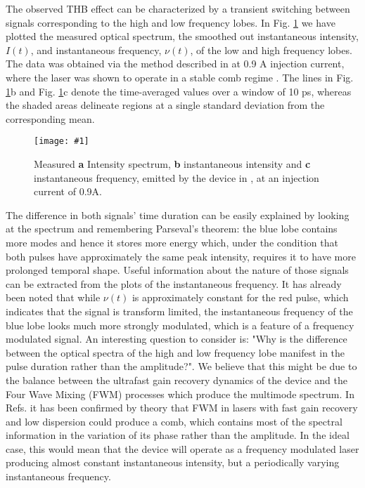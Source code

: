 \documentclass[]{spie}  %
\newcommand{\includegraphicsXL}[1]{\texttt{[image: \#1]}}
\begin{document}
The observed THB effect can be characterized by a transient switching between signals corresponding to the high and low frequency lobes. In Fig. \ref{fig:exper_0p9A} we have plotted  the measured optical spectrum, the smoothed out instantaneous intensity, $I(t)$, and instantaneous frequency, $\nu(t)$, of the low and high frequency lobes. The data was obtained via the method described in  at 0.9 A injection current, where the laser was shown to operate in a stable comb regime \cite{burghoff2014terahertz}. The lines in Fig. \ref{fig:exper_0p9A}b and Fig. \ref{fig:exper_0p9A}c denote the time-averaged values over a window of 10 ps, whereas the shaded areas delineate regions at a single standard deviation from the corresponding mean.  

\begin{figure}[h!]
	\begin{center}
		\includegraphicsXL{IMGS/exper_0p9A.eps}
		\caption{ Measured \textbf{a} Intensity spectrum, \textbf{b} instantaneous intensity and \textbf{c} instantaneous frequency, emitted by the device in , at an injection current of 0.9A.} \label{fig:exper_0p9A}
	\end{center}	
\end{figure}

The difference in both signals' time duration can be easily explained by looking at the spectrum and remembering Parseval's theorem: the blue lobe contains more modes and hence it stores more energy which, under the condition that both pulses have approximately the same peak intensity, requires it to have more prolonged temporal shape. Useful information about the nature of those signals can be extracted from the plots of the instantaneous frequency. It has already been noted \cite{burghoff2015evaluating} that while $\nu(t)$  is approximately constant for the red pulse, which indicates that the signal is transform limited, the instantaneous frequency of the blue lobe looks much more strongly modulated, which is a feature of a frequency modulated signal. An interesting question to consider is: "Why is the difference between the optical spectra of the high and low frequency lobe manifest in the pulse duration rather than the amplitude?". We believe that this might be due to the balance between the ultrafast gain recovery dynamics of the device and the Four Wave Mixing (FWM) processes which produce the multimode spectrum. In Refs.  it has been confirmed by theory that FWM in lasers with fast gain recovery and low dispersion could produce a comb, which contains most of the spectral information in the variation of its phase rather than the amplitude. In the ideal case, this would mean that the device will operate as a frequency modulated laser producing almost constant instantaneous intensity, but a periodically varying instantaneous frequency. 
\end{document}
